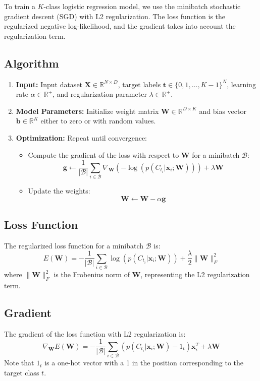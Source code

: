 \documentclass[11pt]{article}
\begin{document}
To train a \( K \)-class logistic regression model, we use the minibatch stochastic gradient descent (SGD) with L2 regularization. The loss function is the regularized negative log-likelihood, and the gradient takes into account the regularization term.

\subsection*{Algorithm}
\begin{enumerate}
    \item \textbf{Input:} Input dataset \( \mathbf{X} \in \mathbb{R}^{N \times D} \), target labels \( \mathbf{t} \in \{0, 1, \ldots, K-1\}^N \), learning rate \( \alpha \in \mathbb{R}^+ \), and regularization parameter \( \lambda \in \mathbb{R}^+ \).
    
    \item \textbf{Model Parameters:} Initialize weight matrix \( \mathbf{W} \in \mathbb{R}^{D \times K} \) and bias vector \( \mathbf{b} \in \mathbb{R}^K \) either to zero or with random values.
    
    \item \textbf{Optimization:} Repeat until convergence:
    \begin{itemize}
        \item Compute the gradient of the loss with respect to \( \mathbf{W} \) for a minibatch \( \mathcal{B} \):
        \[
        \mathbf{g} \leftarrow \frac{1}{|\mathcal{B}|} \sum_{i \in \mathcal{B}} \nabla_{\mathbf{W}} \left( -\log(p(C_{t_i} | \mathbf{x}_i; \mathbf{W})) \right) + \lambda \mathbf{W}
        \]
        
        \item Update the weights:
        \[
        \mathbf{W} \leftarrow \mathbf{W} - \alpha \mathbf{g}
        \]
    \end{itemize}
\end{enumerate}

\subsection*{Loss Function}
The regularized loss function for a minibatch \( \mathcal{B} \) is:
\[
E(\mathbf{W}) = -\frac{1}{|\mathcal{B}|} \sum_{i \in \mathcal{B}} \log(p(C_{t_i} | \mathbf{x}_i; \mathbf{W})) + \frac{\lambda}{2} \|\mathbf{W}\|^2_F
\]
where \( \|\mathbf{W}\|^2_F \) is the Frobenius norm of \( \mathbf{W} \), representing the L2 regularization term.

\subsection*{Gradient}
The gradient of the loss function with L2 regularization is:
\[
\nabla_{\mathbf{W}} E(\mathbf{W}) = -\frac{1}{|\mathcal{B}|} \sum_{i \in \mathcal{B}} (p(C_{t_i} | \mathbf{x}_i; \mathbf{W}) - 1_t) \mathbf{x}_i^T + \lambda \mathbf{W}
\]
Note that $1_t$ is a one-hot vector with a 1 in the position corresponding to the target class $t$.
\end{document}
